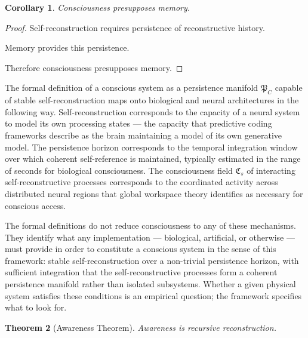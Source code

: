 \documentclass[12pt,oneside]{article}
\newtheorem{theorem}{Theorem}[section] \newtheorem{lemma}[theorem]{Lemma} \newtheorem{proposition}[theorem]{Proposition} \newtheorem{corollary}[theorem]{Corollary}
\theoremstyle{definition}
\begin{document}
\begin{corollary}

Consciousness presupposes memory.

\end{corollary}

\begin{proof}

Self-reconstruction requires persistence of reconstructive history.

Memory provides this persistence.

Therefore consciousness presupposes memory.

\end{proof}

\begin{remark}

The formal definition of a conscious system as a persistence manifold \(\mathfrak{P}_C\) capable of stable self-reconstruction maps onto biological and neural architectures in the following way. Self-reconstruction corresponds to the capacity of a neural system to model its own processing states --- the capacity that predictive coding frameworks describe as the brain maintaining a model of its own generative model. The persistence horizon corresponds to the temporal integration window over which coherent self-reference is maintained, typically estimated in the range of seconds for biological consciousness. The consciousness field \(\mathfrak{C}_s\) of interacting self-reconstructive processes corresponds to the coordinated activity across distributed neural regions that global workspace theory identifies as necessary for conscious access.

The formal definitions do not reduce consciousness to any of these mechanisms. They identify what any implementation --- biological, artificial, or otherwise --- must provide in order to constitute a conscious system in the sense of this framework: stable self-reconstruction over a non-trivial persistence horizon, with sufficient integration that the self-reconstructive processes form a coherent persistence manifold rather than isolated subsystems. Whether a given physical system satisfies these conditions is an empirical question; the framework specifies what to look for.

\end{remark}

\begin{theorem}[Awareness Theorem]

Awareness is recursive reconstruction.

\end{theorem}
\end{document}
